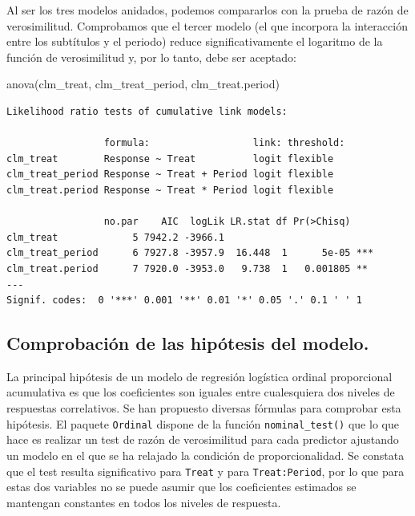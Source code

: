 \documentclass[
  12pt,
  a4paper,
  extrafontsizes,
  onecolumn,
  openright]{memoir}
\newenvironment{Shaded}{\begin{snugshade}}{\end{snugshade}}
\newcommand{\FunctionTok}[1]{\textcolor[rgb]{0.28,0.35,0.67}{#1}}
\newcommand{\NormalTok}[1]{\textcolor[rgb]{0.00,0.23,0.31}{#1}}
\begin{document}
Al ser los tres modelos anidados, podemos compararlos con la prueba de
razón de verosimilitud. Comprobamos que el tercer modelo (el que
incorpora la interacción entre los subtítulos y el periodo) reduce
significativamente el logaritmo de la función de verosimilitud y, por lo
tanto, debe ser aceptado:

\scriptsize

\begin{Shaded}
\begin{Highlighting}[]
\FunctionTok{anova}\NormalTok{(clm\_treat, clm\_treat\_period, clm\_treat.period)}
\end{Highlighting}
\end{Shaded}

\begin{verbatim}
Likelihood ratio tests of cumulative link models:
 
                 formula:                  link: threshold:
clm_treat        Response ~ Treat          logit flexible  
clm_treat_period Response ~ Treat + Period logit flexible  
clm_treat.period Response ~ Treat * Period logit flexible  

                 no.par    AIC  logLik LR.stat df Pr(>Chisq)    
clm_treat             5 7942.2 -3966.1                          
clm_treat_period      6 7927.8 -3957.9  16.448  1      5e-05 ***
clm_treat.period      7 7920.0 -3953.0   9.738  1   0.001805 ** 
---
Signif. codes:  0 '***' 0.001 '**' 0.01 '*' 0.05 '.' 0.1 ' ' 1
\end{verbatim}

\normalsize

\hypertarget{comprobaciuxf3n-de-las-hipuxf3tesis-del-modelo.}{%
\subsection{Comprobación de las hipótesis del
modelo.}\label{comprobaciuxf3n-de-las-hipuxf3tesis-del-modelo.}}

La principal hipótesis de un modelo de regresión logística ordinal
proporcional acumulativa es que los coeficientes son iguales entre
cualesquiera dos niveles de respuestas correlativos. Se han propuesto
diversas fórmulas para comprobar esta hipótesis. El paquete
\texttt{Ordinal} dispone de la función \texttt{nominal\_test()} que lo
que hace es realizar un test de razón de verosimilitud para cada
predictor ajustando un modelo en el que se ha relajado la condición de
proporcionalidad. Se constata que el test resulta significativo para
\texttt{Treat} y para \texttt{Treat:Period}, por lo que para estas dos
variables no se puede asumir que los coeficientes estimados se mantengan
constantes en todos los niveles de respuesta.
\end{document}
